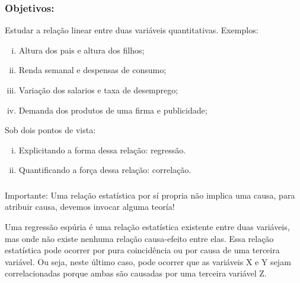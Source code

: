 \documentclass[14pt,aspectratio=1610]{beamer}
\begin{document}
\begin{frame}{}
\frametitle{Objetivos:}
\begin{block}{}
\justifying
Estudar a relação linear entre duas variáveis quantitativas. Exemplos:
\begin{enumerate}[(i)]
\item Altura dos pais e altura dos filhos;\pause
\item Renda semanal e despensas de consumo;\pause
\item Variação dos salarios e taxa de desemprego;\pause
\item Demanda dos produtos de uma firma e publicidade;\pause
\end{enumerate}
\end{block}
\begin{block}{}
\justifying
Sob dois pontos de vista:
\begin{enumerate}[(i)]
\item Explicitando a forma dessa relação: regressão.\pause
\item Quantificando a força dessa relação: correlação.
\end{enumerate}
\end{block}
\end{frame}

\begin{frame}{}
\frametitle{ }
\begin{block}{Importante:}
\justifying
Uma relação estatística por sí propria não implica uma causa, para atribuir causa, devemos invocar alguma teoría!
\end{block}
\pause
\begin{block}{}
\justifying
Uma regressão espúria é uma relação estatística existente entre duas variáveis, mas onde não existe nenhuma relação causa-efeito entre elas. Essa relação estatística pode ocorrer por pura coincidência ou por causa de uma terceira variável. Ou seja, neste último caso, pode ocorrer que as variáveis X e Y sejam correlacionadas porque ambas são causadas por uma terceira variável Z.
\end{block}
\end{frame}
\end{document}
